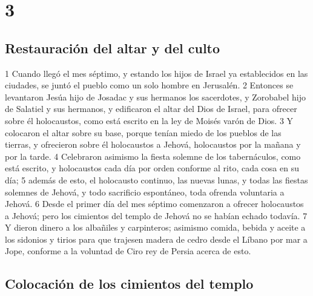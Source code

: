 \chapter{3}

\section*{Restauración del altar y del culto}


1 Cuando llegó el mes séptimo, y estando los hijos de Israel ya establecidos en las ciudades, se juntó el pueblo como un solo hombre en Jerusalén.
2 Entonces se levantaron Jesúa hijo de Josadac y sus hermanos los sacerdotes, y Zorobabel hijo de Salatiel y sus hermanos, y edificaron el altar del Dios de Israel, para ofrecer sobre él holocaustos, como está escrito en la ley de Moisés varón de Dios.
3 Y colocaron el altar sobre su base, porque tenían miedo de los pueblos de las tierras, y ofrecieron sobre él holocaustos a Jehová, holocaustos por la mañana y por la tarde. 
4 Celebraron asimismo la fiesta solemne de los tabernáculos, como está escrito, y holocaustos cada día por orden conforme al rito, cada cosa en su día;
5 además de esto, el holocausto continuo, las nuevas lunas, y todas las fiestas solemnes de Jehová, y todo sacrificio espontáneo, toda ofrenda voluntaria a Jehová.
6 Desde el primer día del mes séptimo comenzaron a ofrecer holocaustos a Jehová; pero los cimientos del templo de Jehová no se habían echado todavía.
7 Y dieron dinero a los albañiles y carpinteros; asimismo comida, bebida y aceite a los sidonios y tirios para que trajesen madera de cedro desde el Líbano por mar a Jope, conforme a la voluntad de Ciro rey de Persia acerca de esto.
\section*{Colocación de los cimientos del templo}

